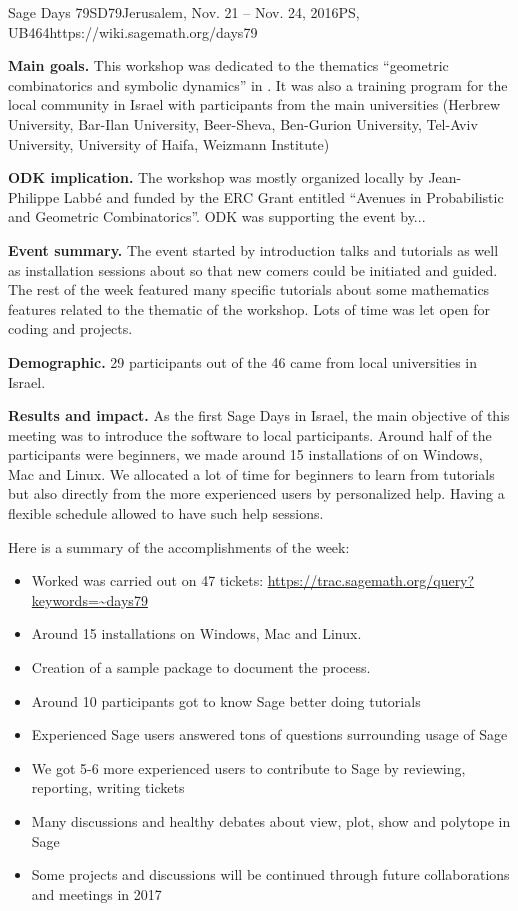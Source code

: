 \begin{event}{Sage Days 79}{SD79}{Jerusalem, Nov. 21 -- Nov. 24, 2016}{PS, UB}{46}{4}{https://wiki.sagemath.org/days79}

\textbf{Main goals.} This workshop was dedicated to the thematics ``geometric combinatorics and symbolic dynamics'' in \Sage. It was also a training program
for the local community in Israel with participants from the main universities (Herbrew University, Bar-Ilan University, Beer-Sheva, Ben-Gurion University, Tel-Aviv University, University of Haifa, Weizmann Institute)

\textbf{ODK implication.} The workshop was mostly organized locally by Jean-Philippe Labbé and funded by the ERC Grant entitled ``Avenues in Probabilistic and Geometric Combinatorics''. ODK was supporting the event by...

\textbf{Event summary.} The event started by introduction talks and tutorials as well as installation sessions about \Sage so that new comers could be initiated and guided. The rest of the week featured many specific tutorials about some mathematics features related to the thematic of the workshop. Lots of time was let open for coding and projects.

\textbf{Demographic.} 29 participants out of the 46 came from local universities in Israel. 

\textbf{Results and impact.} As the first Sage Days in Israel, the main objective of this meeting was to introduce the software to local participants. Around half of the participants were beginners, we made around 15 installations of \Sage on Windows, Mac and Linux. We allocated a lot of time for beginners to learn from tutorials but also directly from the more experienced users by personalized help. Having a flexible schedule allowed to have such help sessions.

Here is a summary of the accomplishments of the week:

\begin{itemize}
    \item    Worked was carried out on 47 \Sage tickets: \url{https://trac.sagemath.org/query?keywords=~days79}
    \item    Around 15 installations on Windows, Mac and Linux.
    \item    Creation of a sample \Sage package to document the process.
    \item    Around 10 participants got to know Sage better doing tutorials
    \item    Experienced Sage users answered tons of questions surrounding usage of Sage
    \item    We got 5-6 more experienced users to contribute to Sage by reviewing, reporting, writing tickets
    \item    Many discussions and healthy debates about view, plot, show and polytope in Sage
    \item    Some projects and discussions will be continued through future collaborations and meetings in 2017 
\end{itemize}


\end{event}